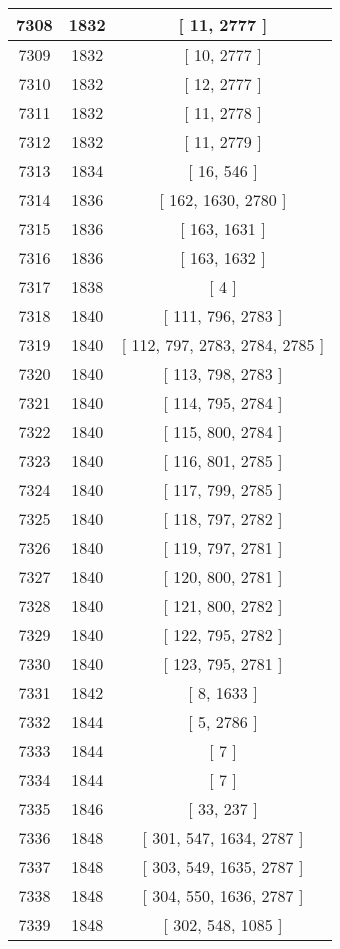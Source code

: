 \begin{center}
\begin{longtable}[H]{|| c c c ||}
\hline
7308 & 1832 & [ 11, 2777 ] \\ 
\hline
7309 & 1832 & [ 10, 2777 ] \\ 
\hline
7310 & 1832 & [ 12, 2777 ] \\ 
\hline
7311 & 1832 & [ 11, 2778 ] \\ 
\hline
7312 & 1832 & [ 11, 2779 ] \\ 
\hline
7313 & 1834 & [ 16, 546 ] \\ 
\hline
7314 & 1836 & [ 162, 1630, 2780 ] \\ 
\hline
7315 & 1836 & [ 163, 1631 ] \\ 
\hline
7316 & 1836 & [ 163, 1632 ] \\ 
\hline
7317 & 1838 & [ 4 ] \\ 
\hline
7318 & 1840 & [ 111, 796, 2783 ] \\ 
\hline
7319 & 1840 & [ 112, 797, 2783, 2784, 2785 ] \\ 
\hline
7320 & 1840 & [ 113, 798, 2783 ] \\ 
\hline
7321 & 1840 & [ 114, 795, 2784 ] \\ 
\hline
7322 & 1840 & [ 115, 800, 2784 ] \\ 
\hline
7323 & 1840 & [ 116, 801, 2785 ] \\ 
\hline
7324 & 1840 & [ 117, 799, 2785 ] \\ 
\hline
7325 & 1840 & [ 118, 797, 2782 ] \\ 
\hline
7326 & 1840 & [ 119, 797, 2781 ] \\ 
\hline
7327 & 1840 & [ 120, 800, 2781 ] \\ 
\hline
7328 & 1840 & [ 121, 800, 2782 ] \\ 
\hline
7329 & 1840 & [ 122, 795, 2782 ] \\ 
\hline
7330 & 1840 & [ 123, 795, 2781 ] \\ 
\hline
7331 & 1842 & [ 8, 1633 ] \\ 
\hline
7332 & 1844 & [ 5, 2786 ] \\ 
\hline
7333 & 1844 & [ 7 ] \\ 
\hline
7334 & 1844 & [ 7 ] \\ 
\hline
7335 & 1846 & [ 33, 237 ] \\ 
\hline
7336 & 1848 & [ 301, 547, 1634, 2787 ] \\ 
\hline
7337 & 1848 & [ 303, 549, 1635, 2787 ] \\ 
\hline
7338 & 1848 & [ 304, 550, 1636, 2787 ] \\ 
\hline
7339 & 1848 & [ 302, 548, 1085 ] \\ 

\end{longtable}
\end{center}

